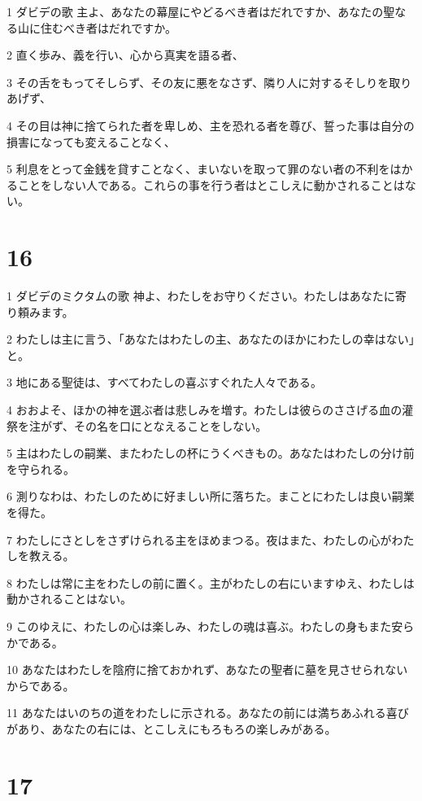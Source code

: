 \par 1 ダビデの歌 主よ、あなたの幕屋にやどるべき者はだれですか、あなたの聖なる山に住むべき者はだれですか。
\par 2 直く歩み、義を行い、心から真実を語る者、
\par 3 その舌をもってそしらず、その友に悪をなさず、隣り人に対するそしりを取りあげず、
\par 4 その目は神に捨てられた者を卑しめ、主を恐れる者を尊び、誓った事は自分の損害になっても変えることなく、
\par 5 利息をとって金銭を貸すことなく、まいないを取って罪のない者の不利をはかることをしない人である。これらの事を行う者はとこしえに動かされることはない。

\chapter{16}

\par 1 ダビデのミクタムの歌 神よ、わたしをお守りください。わたしはあなたに寄り頼みます。
\par 2 わたしは主に言う、「あなたはわたしの主、あなたのほかにわたしの幸はない」と。
\par 3 地にある聖徒は、すべてわたしの喜ぶすぐれた人々である。
\par 4 おおよそ、ほかの神を選ぶ者は悲しみを増す。わたしは彼らのささげる血の灌祭を注がず、その名を口にとなえることをしない。
\par 5 主はわたしの嗣業、またわたしの杯にうくべきもの。あなたはわたしの分け前を守られる。
\par 6 測りなわは、わたしのために好ましい所に落ちた。まことにわたしは良い嗣業を得た。
\par 7 わたしにさとしをさずけられる主をほめまつる。夜はまた、わたしの心がわたしを教える。
\par 8 わたしは常に主をわたしの前に置く。主がわたしの右にいますゆえ、わたしは動かされることはない。
\par 9 このゆえに、わたしの心は楽しみ、わたしの魂は喜ぶ。わたしの身もまた安らかである。
\par 10 あなたはわたしを陰府に捨ておかれず、あなたの聖者に墓を見させられないからである。
\par 11 あなたはいのちの道をわたしに示される。あなたの前には満ちあふれる喜びがあり、あなたの右には、とこしえにもろもろの楽しみがある。

\chapter{17}

